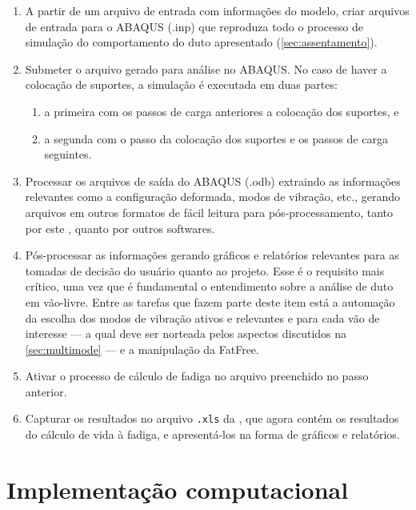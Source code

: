 \begin{enumerate}[label= (\arabic*)]
    \item A partir de um arquivo de entrada com informações do modelo, criar arquivos de entrada para o ABAQUS (.inp) que reproduza todo o processo de simulação do comportamento do duto apresentado (\autoref{sec:assentamento}).
    \item Submeter o arquivo gerado para análise no ABAQUS. No caso de haver a colocação de suportes, a simulação é executada em duas partes:
    \begin{enumerate}
        \item a primeira com os passos de carga anteriores a colocação dos suportes, e
        \item a segunda com o passo da colocação dos suportes e os passos de carga seguintes.
    \end{enumerate}
    \item Processar os arquivos de saída do ABAQUS (.odb) extraindo as informações relevantes como a configuração deformada, modos de vibração, etc., gerando arquivos em outros formatos de fácil leitura para pós-processamento, tanto por este \frame, quanto por outros softwares.
    \item Pós-processar as informações gerando gráficos e relatórios relevantes para as tomadas de decisão do usuário quanto ao projeto. Esse é o requisito mais crítico, uma vez que é fundamental o entendimento sobre a análise de duto em vão-livre. Entre as tarefas que fazem parte deste item está a automação da escolha dos modos de vibração ativos e relevantes e para cada vão de interesse --- a qual deve ser norteada pelos aspectos discutidos na \autoref{sec:multimode} --- e a manipulação da FatFree.
    \item Ativar o processo de cálculo de fadiga no arquivo preenchido no passo anterior.
    \item Capturar os resultados no arquivo \texttt{.xls} da \fatfree, que agora contém os resultados do cálculo de vida à fadiga, e apresentá-los na forma de gráficos e relatórios.
\end{enumerate}


\section{Implementação computacional}


